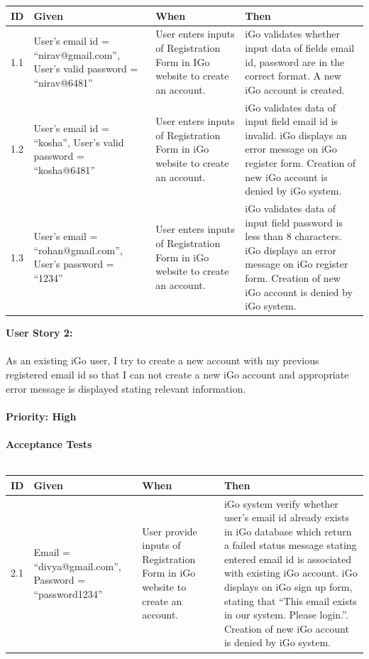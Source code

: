 \documentclass[11pt, english]{report}
\begin{document}
\setlength{\tabcolsep}{18pt}
\renewcommand{\arraystretch}{1.5}
\begin{tabular}{ |p{0.5cm}|p{3cm}|p{3.5cm}|p{5cm}| }
\hline
\textbf{ID} & \textbf{Given} & \textbf{When} & \textbf{Then}\\
\hline
1.1 &
User’s email id = “nirav@gmail.com”, User’s valid password = “nirav@6481” &
User enters inputs of Registration Form in IGo website to create an account. &
iGo validates whether input data of fields email id, password are in the correct format. A new iGo account is created.
 \\
\hline
1.2 &
User’s email id = “kosha”, 
User’s valid password = “kosha@6481” &
User enters inputs of Registration Form in iGo website to create an account. &
iGo validates data of input field email id is invalid. iGo displays an error message on iGo register form. Creation of new iGo account is denied by iGo system.
\\

\hline
1.3 &
User’s email = “rohan@gmail.com”,
User’s password = “1234”
&
User enters inputs of Registration Form in iGo website to create an account. & 
iGo validates data of input field password is less than 8 characters. iGo displays an error message on iGo register form.
Creation of new iGo account is denied by iGo system.
 \\
\hline
\end{tabular}


\vspace*{0.2in}
\textbf{User Story 2: }\\ \\
As an existing iGo user, I try to create a new account with my previous registered email id so that I can not create a new iGo account and appropriate error message is displayed stating relevant information.
\\ \\
\textbf{Priority: High} \\ \\
\textbf{Acceptance Tests} \\ \\
\setlength{\tabcolsep}{18pt}
\renewcommand{\arraystretch}{1.5}
\begin{tabular}{ |p{0.5cm}|p{3cm}|p{3.5cm}|p{5cm}| }
\hline
\textbf{ID} & \textbf{Given} & \textbf{When} & \textbf{Then}\\
\hline
2.1 &
Email = “divya@gmail.com”, 
Password = “password1234”
&
User provide inputs of Registration Form in iGo website to create an account. &
iGo system verify whether user's email id already exists in iGo database which return a failed  status message stating entered email id is associated with existing iGo account.
iGo displays on iGo sign up form, stating that “This email exists in our system. Please login.”.
Creation of new iGo account is denied by iGo system.

\\
\hline
\end{tabular}
\end{document}
